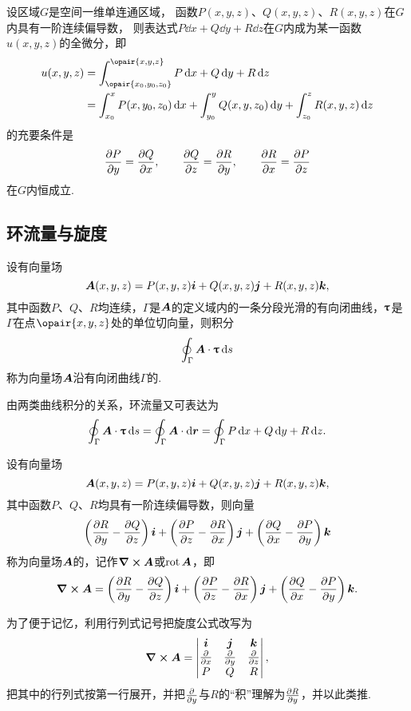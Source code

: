 \begin{theorem}
设区域\(G\)是空间一维单连通区域，
函数\(P(x,y,z)\)、\(Q(x,y,z)\)、\(R(x,y,z)\)在\(G\)内具有一阶连续偏导数，
则表达式\(P\dd{x}+Q\dd{y}+R\dd{z}\)在\(G\)内成为某一函数\(u(x,y,z)\)的全微分，即\begin{align*}
u(x,y,z)
&= \int_{\opair{x_0,y_0,z_0}}^{\opair{x,y,z}}
 P\dd{x}+Q\dd{y}+R\dd{z} \\
&= \int_{x_0}^x P(x,y_0,z_0) \dd{x}
+ \int_{y_0}^y Q(x,y,z_0) \dd{y}
+ \int_{z_0}^z R(x,y,z) \dd{z}
\end{align*}的充要条件是\[
\pdv{P}{y}=\pdv{Q}{x}, \qquad
\pdv{Q}{z}=\pdv{R}{y}, \qquad
\pdv{R}{x}=\pdv{P}{z}
\]在\(G\)内恒成立.
\end{theorem}

\subsection{环流量与旋度}
\begin{definition}
设有向量场\[
\boldsymbol{A}(x,y,z)=P(x,y,z)\boldsymbol{i}+Q(x,y,z)\boldsymbol{j}+R(x,y,z)\boldsymbol{k},
\]其中函数\(P\)、\(Q\)、\(R\)均连续，\(\Gamma\)是\(\boldsymbol{A}\)的定义域内的一条分段光滑的有向闭曲线，\(\boldsymbol{\uptau}\)是\(\Gamma\)在点\(\opair{x,y,z}\)处的单位切向量，则积分\[
\oint_{\Gamma}{\boldsymbol{A}\cdot\boldsymbol{\uptau}\dd{s}}
\]称为向量场\(\boldsymbol{A}\)沿有向闭曲线\(\Gamma\)的.
\end{definition}
由两类曲线积分的关系，环流量又可表达为\[
\oint_{\Gamma}{\boldsymbol{A}\cdot\boldsymbol{\uptau}\dd{s}}
=\oint_{\Gamma}{\boldsymbol{A}\cdot\dd{\boldsymbol{r}}}
=\oint_{\Gamma}{P\dd{x}+Q\dd{y}+R\dd{z}}.
\]

\begin{definition}
设有向量场\[
\boldsymbol{A}(x,y,z)=P(x,y,z)\boldsymbol{i}+Q(x,y,z)\boldsymbol{j}+R(x,y,z)\boldsymbol{k},
\]其中函数\(P\)、\(Q\)、\(R\)均具有一阶连续偏导数，则向量\[
\left( \pdv{R}{y} - \pdv{Q}{z} \right)\boldsymbol{i}
+\left( \pdv{P}{z} - \pdv{R}{x} \right)\boldsymbol{j}
+\left( \pdv{Q}{x} - \pdv{P}{y} \right)\boldsymbol{k}
\]称为向量场\(\boldsymbol{A}\)的，记作\(\curl{\boldsymbol{A}}\)或\(\operatorname{rot}\boldsymbol{A}\)，即\[
\curl{\boldsymbol{A}}
=\left( \pdv{R}{y} - \pdv{Q}{z} \right)\boldsymbol{i}
+\left( \pdv{P}{z} - \pdv{R}{x} \right)\boldsymbol{j}
+\left( \pdv{Q}{x} - \pdv{P}{y} \right)\boldsymbol{k}.
\]
\end{definition}

为了便于记忆，利用行列式记号把旋度公式改写为\[
\curl{\boldsymbol{A}}
=\begin{vmatrix}
\boldsymbol{i} & \boldsymbol{j} & \boldsymbol{k} \\
\pdv{x} & \pdv{y} & \pdv{z} \\
P & Q & R \\
\end{vmatrix},
\]把其中的行列式按第一行展开，并把\(\pdv{y}\)与\(R\)的“积”理解为\(\pdv{R}{y}\)，并以此类推.

